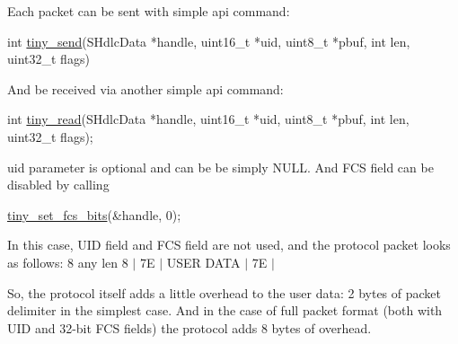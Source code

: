 Each packet can be sent with simple api command\+: 
\begin{DoxyCode}
\textcolor{keywordtype}{int} \hyperlink{src_2arduino_2src_2proto_2tiny__layer2_8h_a988a41addbe75dc15cc13006de6740e0}{tiny\_send}(SHdlcData *handle, uint16\_t *uid, uint8\_t *pbuf, \textcolor{keywordtype}{int} len, uint32\_t flags)
\end{DoxyCode}


And be received via another simple api command\+:


\begin{DoxyCode}
\textcolor{keywordtype}{int} \hyperlink{src_2arduino_2src_2proto_2tiny__layer2_8h_a470d59a60a496944e63031ba43a00e3d}{tiny\_read}(SHdlcData *handle, uint16\_t *uid, uint8\_t *pbuf, \textcolor{keywordtype}{int} len, uint32\_t flags);
\end{DoxyCode}


uid parameter is optional and can be be simply N\+U\+L\+L. And F\+C\+S field can be disabled by calling 
\begin{DoxyCode}
\hyperlink{src_2arduino_2src_2proto_2tiny__layer2_8h_a5e66725a2818491d4e2b1134951d9229}{tiny\_set\_fcs\_bits}(&handle, 0);
\end{DoxyCode}
 In this case, U\+I\+D field and F\+C\+S field are not used, and the protocol packet looks as follows\+: 8 any len 8 $\vert$ 7\+E $\vert$ U\+S\+E\+R D\+A\+T\+A $\vert$ 7\+E $\vert$

So, the protocol itself adds a little overhead to the user data\+: 2 bytes of packet delimiter in the simplest case. And in the case of full packet format (both with U\+I\+D and 32-\/bit F\+C\+S fields) the protocol adds 8 bytes of overhead. 